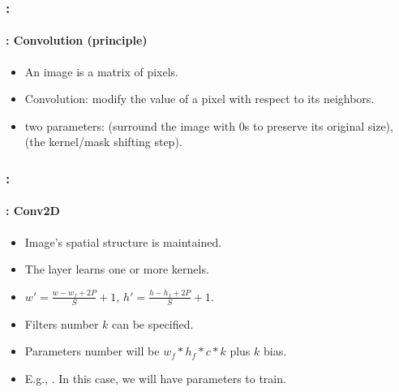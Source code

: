 \documentclass[xcolor=table]{beamer}
\begin{document}
\begin{frame}
	\frametitle{\insertshortsubtitle: \insertsection}
	\framesubtitle{\insertsubsection: Convolution (principle)}
	
	\begin{itemize}
		\item An image is a matrix of pixels.
		\item Convolution: modify the value of a pixel with respect to its neighbors.
		\item two parameters:  (surround the image with 0s to preserve its original size),  (the kernel/mask shifting step).
	\end{itemize}
	
	\begin{center}
	\end{center}
	
\end{frame}

\begin{frame}
	\frametitle{\insertshortsubtitle: \insertsection}
	\framesubtitle{\insertsubsection: Conv2D}
	
	\begin{minipage}{0.60\textwidth} 
		\begin{itemize}
			\item Image's spatial structure is maintained.
			\item The layer learns one or more kernels.
			\item $ w' = \frac{w - w_f + 2P}{S} + 1$,  $ h' = \frac{h - h_f + 2P}{S} + 1$.
			\item Filters number $k$ can be specified.
			\item Parameters number will be $w_f * h_f * c * k$ plus $k$ bias.
			\item E.g., . In this case, we will have  parameters to train.
		\end{itemize}
	\end{minipage}
	\begin{minipage}{0.39\textwidth}
	\end{minipage}
	
\end{frame}
\end{document}
